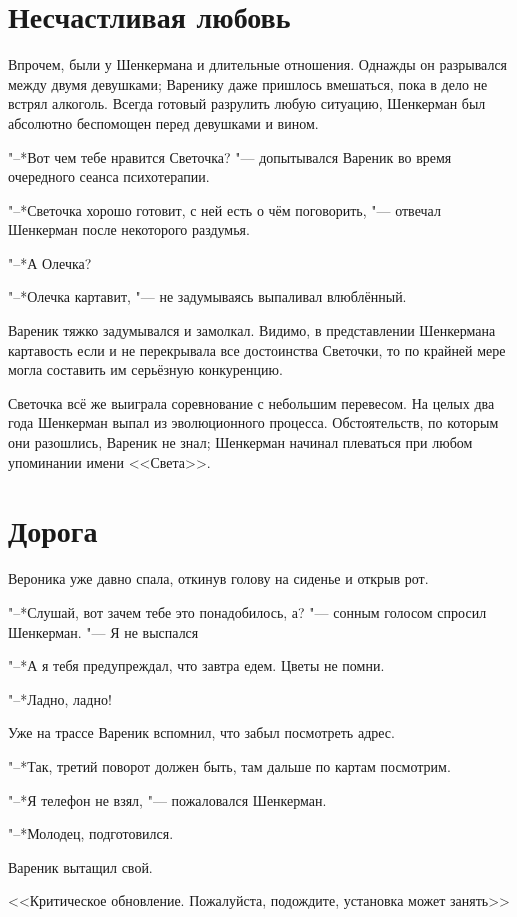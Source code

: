 \section{Несчастливая любовь}

Впрочем, были у Шенкермана и длительные отношения.
Однажды он разрывался между двумя девушками;
Варенику даже пришлось вмешаться, пока в дело не встрял алкоголь.
Всегда готовый разрулить любую ситуацию, Шенкерман был абсолютно беспомощен перед девушками и вином.

"--*Вот чем тебе нравится Светочка? "--- допытывался Вареник во время очередного сеанса психотерапии.

"--*Светочка хорошо готовит, с ней есть о чём поговорить, "--- отвечал Шенкерман после некоторого раздумья.

"--*А Олечка?

"--*Олечка картавит, "--- не задумываясь выпаливал влюблённый.

Вареник тяжко задумывался и замолкал.
Видимо, в представлении Шенкермана картавость если и не перекрывала все достоинства Светочки, то по крайней мере могла составить им серьёзную конкуренцию.

Светочка всё же выиграла соревнование с небольшим перевесом.
На целых два года Шенкерман выпал из эволюционного процесса.
Обстоятельств, по которым они разошлись, Вареник не знал;
Шенкерман начинал плеваться при любом упоминании имени <<Света>>.

\section{Дорога}

Вероника уже давно спала, откинув голову на сиденье и открыв рот.

"--*Слушай, вот зачем тебе это понадобилось, а? "--- сонным голосом спросил Шенкерман.
"--- Я не выспался\ldotst

"--*А я тебя предупреждал, что завтра едем.
Цветы не помни.

"--*Ладно, ладно!

Уже на трассе Вареник вспомнил, что забыл посмотреть адрес.

"--*Так, третий поворот должен быть, там дальше по картам посмотрим.

"--*Я телефон не взял, "--- пожаловался Шенкерман.

"--*Молодец, подготовился.

Вареник вытащил свой.

<<Критическое обновление.
Пожалуйста, подождите, установка может занять\ldotst>>

